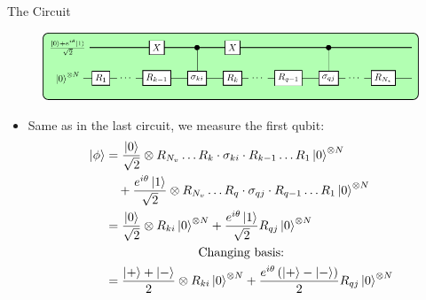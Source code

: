 \documentclass[professionalfonts]{beamer}
\newcommand{\ket}[1]{\ensuremath{\left|#1\right\rangle}}
\newcommand{\paren}[1]{\left( #1 \right)}
\newcommand{\elec}{N}
\begin{document}


\begin{frame}{The Circuit}
\begin{figure}[ht!]
\includegraphics[width=\linewidth]{../circuits/circuit2}
\end{figure}
	\begin{itemize}
		\item Same as in the last circuit, we measure the first qubit:
\begin{equation*}
	\begin{split}
		\ket \phi
		&= \frac{\ket 0}{\sqrt 2} \otimes R_{N_v} \ldots R_k \cdot \sigma_{ki} \cdot R_{k-1} \ldots R_1 \ket 0^{\otimes \elec}\\
		&\quad + \frac{e^{i\theta}\ket 1}{\sqrt 2} \otimes R_{N_v} \ldots R_q \cdot \sigma_{qj} \cdot R_{q-1} \ldots R_1 \ket 0^{\otimes \elec}\\
		&= \frac{\ket 0}{\sqrt 2} \otimes R_{ki} \ket 0^{\otimes \elec}
		+ \frac{e^{i\theta}\ket 1}{\sqrt 2} R_{qj}\ket 0^{\otimes \elec}\\
		\span\text{Changing basis:}\\
		&= \frac{\ket + + \ket -}{2} \otimes R_{ki} \ket 0^{\otimes \elec}
		+ \frac{e^{i\theta}\paren{\ket + - \ket -}}{2} R_{qj}\ket 0^{\otimes \elec}
	\end{split}
\end{equation*}
	\end{itemize}
\end{frame}

\end{document}
